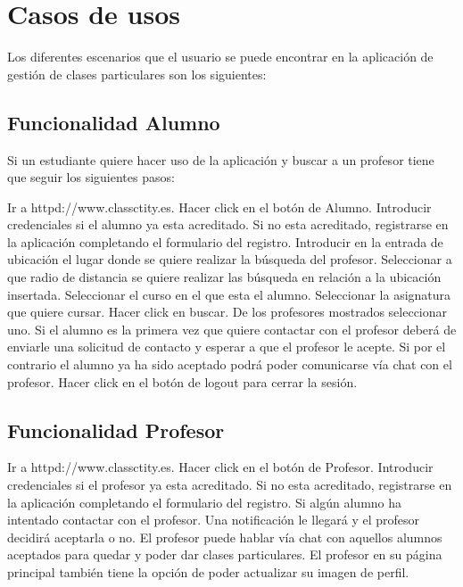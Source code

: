 \section{Casos de usos}

Los diferentes escenarios que el usuario se puede encontrar en la aplicación de gestión de clases particulares son los siguientes:

\subsection{Funcionalidad Alumno}

Si un estudiante quiere hacer uso de la aplicación y buscar a un profesor tiene que seguir los siguientes pasos:
\begin{enumerate}
\itemize Ir a httpd://www.classctity.es.
\itemize Hacer click en el botón de Alumno.
\itemize Introducir credenciales si el alumno ya esta acreditado. Si no esta acreditado, registrarse en la aplicación completando el formulario del registro.
\itemize Introducir en la entrada de ubicación el lugar donde se quiere realizar la búsqueda del profesor.
\itemize Seleccionar a que radio de distancia se quiere realizar las búsqueda en relación a la ubicación insertada.
\itemize Seleccionar el curso en el que esta el alumno.
\itemize Seleccionar la asignatura que quiere cursar.
\itemize Hacer click en buscar.
\itemize De los profesores mostrados seleccionar uno.
\itemize Si el alumno es la primera vez que quiere contactar con el profesor deberá de enviarle una solicitud de contacto y esperar a que el profesor le acepte. Si por el contrario el alumno ya ha sido aceptado podrá poder comunicarse vía chat con el profesor.
\itemize Hacer click en el botón de logout para cerrar la sesión.
\end{enumerate}

\subsection{Funcionalidad Profesor}
\itemize Ir a httpd://www.classctity.es.
\itemize Hacer click en el botón de Profesor.
\itemize Introducir credenciales si el profesor ya esta acreditado. Si no esta acreditado, registrarse en la aplicación completando el formulario del registro.
\itemize Si algún alumno ha intentado contactar con el profesor. Una notificación le llegará y el profesor decidirá aceptarla o no.
\itemize El profesor puede hablar vía chat con aquellos alumnos aceptados para quedar y poder dar clases particulares.
\itemiza El profesor en su página principal también tiene la opción de poder actualizar su imagen de perfil.
